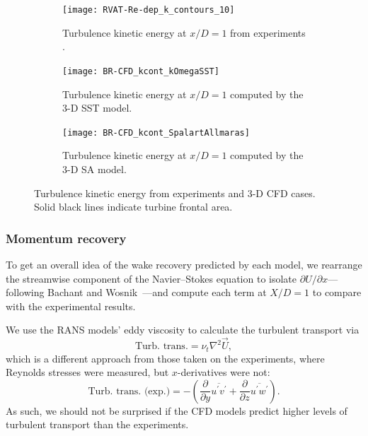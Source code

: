 \documentclass[aip,graphicx]{revtex4-1}
\begin{document}
\begin{figure}
    \centering
    \begin{subfigure}[b]{\textwidth}
        \centering
        
        \texttt{[image: RVAT-Re-dep\_k\_contours\_10]}
        
        \caption{Turbulence kinetic energy at $x/D=1$ from experiments
            \cite{Bachant2016-RVAT-Re-dep}.}
        
        \label{fig:kcont-exp}
    \end{subfigure}
    
    \begin{subfigure}[b]{\textwidth}
        \centering
        
        \texttt{[image: BR-CFD\_kcont\_kOmegaSST]}
        
        \caption{Turbulence kinetic energy at $x/D=1$ computed by the 3-D SST
            model.}
        
        \label{fig:kcont-SST}
    \end{subfigure}
    
    \begin{subfigure}[b]{\textwidth}
        \centering
        
        \texttt{[image: BR-CFD\_kcont\_SpalartAllmaras]}
        
        \caption{Turbulence kinetic energy at $x/D=1$ computed by the 3-D SA
            model.}
        
        \label{fig:kcont-SA}
    \end{subfigure}
    
    \caption{Turbulence kinetic energy from experiments and 3-D CFD cases. Solid
        black lines indicate turbine frontal area.}
    
    \label{fig:br-cfd-kcont}
\end{figure}


\subsubsection{Momentum recovery}

To get an overall idea of the wake recovery predicted by each model, we
rearrange the streamwise component of the Navier--Stokes equation to isolate
$\partial U / \partial x$---following Bachant and
Wosnik~\cite{Bachant2015-JoT}---and compute each term at $X/D = 1$ to compare
with the experimental results.

We use the RANS models' eddy viscosity to calculate the turbulent transport via
\begin{equation}
\text{Turb. trans.} = \nu_t \nabla^2 \vec{U},
\label{eq:turb-trans}
\end{equation}
which is a different approach from those taken on the experiments, where
Reynolds stresses were measured, but $x$-derivatives were not:
\begin{equation}
\text{Turb. trans. (exp.)} =
-\left(
\frac{\partial}{\partial y} \overline{u^\prime v^\prime}
+
\frac{\partial}{\partial z} \overline{u^\prime w^\prime}
\right).
\end{equation}
As such, we should not be surprised if the CFD models predict higher levels of
turbulent transport than the experiments.
\end{document}
